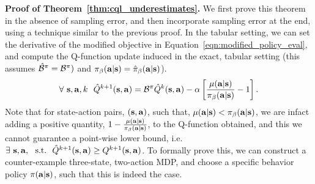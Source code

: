 \textbf{Proof of Theorem~\ref{thm:cql_underestimates}.} We first prove this theorem in the absence of sampling error, and then incorporate sampling error at the end, using a technique similar to the previous proof. In the tabular setting, we can set the derivative of the modified objective in Equation~\ref{eqn:modified_policy_eval}, and compute the Q-function update induced in the exact, tabular setting (this assumes $\hat{\mathcal{B}}^\pi = \mathcal{B}^\pi)$ and ${\pi_\beta}(\mathbf{a}|\mathbf{s}) = \hat{\pi}_\beta(\mathbf{a}|\mathbf{s})$).
\begin{equation}
    \forall ~\mathbf{s}, \mathbf{a}, k ~~ \hat{Q}^{k+1} (\mathbf{s}, \mathbf{a}) = \mathcal{B}^\pi \hat{Q}^k(\mathbf{s}, \mathbf{a}) - \alpha \left[\frac{\mu(\mathbf{a}|\mathbf{s})}{{\pi_\beta}(\mathbf{a}|\mathbf{s})} - 1 \right].
    \label{eqn:q_function_modified_eval}
\end{equation}
Note that for state-action pairs, $(\mathbf{s}, \mathbf{a})$, such that, $\mu(\mathbf{a}|\mathbf{s}) < {\pi_\beta}(\mathbf{a}|\mathbf{s})$, we are infact adding a positive quantity, $1 - \frac{\mu(\mathbf{a}|\mathbf{s})}{{\pi_\beta}(\mathbf{a}|\mathbf{s})}$, to the Q-function obtained, and this we cannot guarantee a point-wise lower bound, i.e. $\exists~ \mathbf{s}, \mathbf{a}, \text{~~s.t.}~~ \hat{Q}^{k+1}(\mathbf{s}, \mathbf{a}) \geq Q^{k+1}(\mathbf{s}, \mathbf{a})$. To formally prove this, we can construct a counter-example three-state, two-action MDP, and choose a specific behavior policy $\pi(\mathbf{a}|\mathbf{s})$, such that this is indeed the case.

